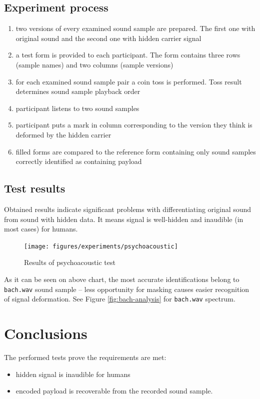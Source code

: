 \documentclass[english,bachelor,a4paper,oneside]{ppfcmthesis}
\begin{document}
\subsection{Experiment process}
\begin{enumerate}
  \item two versions of every examined sound sample are prepared. The first one with original sound and the second one with hidden carrier signal
  \item a test form is provided to each participant. The form contains three rows (sample names) and two columns (sample versions)
  \item for each examined sound sample pair a coin toss is performed. Toss result determines sound sample playback order
  \item participant listens to two sound samples
  \item participant puts a mark in column corresponding to the version they think is deformed by the hidden carrier
  \item filled forms are compared to the reference form containing only sound samples correctly identified as containing payload
\end{enumerate}

\subsection{Test results}
Obtained results indicate significant problems with differentiating original sound from sound with hidden data. It means signal
is well-hidden and inaudible (in most cases) for humans.

\begin{figure}[!hb]
  \centering
  \texttt{[image: figures/experiments/psychoacoustic]}
  \label{fig:psychoacoustic-results}
  \caption{Results of psychoacoustic test}
\end{figure}

As it can be seen on above chart, the most accurate identifications belong to \verb|bach.wav| sound sample -- less opportunity for masking causes easier recognition of signal deformation.
See Figure \ref{fig:bach-analysis} for \verb|bach.wav| spectrum.

\section{Conclusions}
The performed tests prove the requirements are met:
\begin{itemize}
  \item hidden signal is inaudible for humans
  \item encoded payload is recoverable from the recorded sound sample.
\end{itemize}
\end{document}
